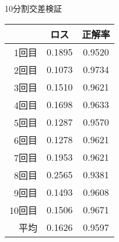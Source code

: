 \documentclass[leno,xcolor=dvipsnames]{beamer}
\begin{document}
\begin{frame}{10分割交差検証}
    \begin{table}[H]
        \centering  
        \begin{tabular}{rSS}
            \toprule    
            & ロス & 正解率 \\
            \midrule
            1回目 & 0.1895 & 0.9520 \\ 
            2回目 & 0.1073 & 0.9734 \\ 
            3回目 & 0.1510 & 0.9621 \\ 
            4回目 & 0.1698 & 0.9633 \\ 
            5回目 & 0.1287 & 0.9570 \\ 
            6回目 & 0.1278 & 0.9621 \\
            7回目 & 0.1953 & 0.9621 \\
            8回目 & 0.2565 & 0.9381 \\
            9回目 & 0.1493 & 0.9608 \\
            10回目 & 0.1506 & 0.9671 \\
            \midrule
            平均 & 0.1626 & 0.9597 \\
            \bottomrule
        \end{tabular}
    \end{table}
\end{frame}
\end{document}
